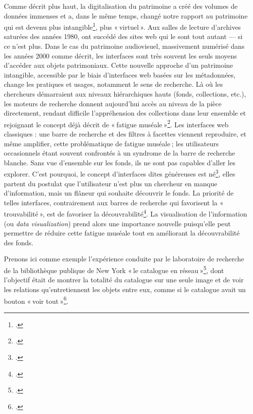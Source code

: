 Comme décrit plus haut, la digitalisation du patrimoine a créé des volumes de données immenses et a, dans le même temps, changé notre rapport au patrimoine qui est devenu plus intangible\footcite[p. 1]{windhager_visualization_2019}, plus « virtuel ». Aux salles de lecture d’archives saturées des années 1980, ont succédé des sites web qui le sont tout autant — si ce n’est plus. Dans le cas du patrimoine audiovisuel, massivement numérisé dans les années 2000 comme décrit, les interfaces sont très souvent les seuls moyens d’accéder aux objets patrimoniaux. Cette nouvelle approche d’un patrimoine intangible, accessible par le biais d’interfaces web basées sur les métadonnées, change les pratiques et usages, notamment le sens de recherche. Là où les chercheurs démarraient aux niveaux hiérarchiques hauts (fonds, collections, etc.), les moteurs de recherche donnent aujourd’hui accès au niveau de la pièce directement, rendant difficile l’appréhension des collections dans leur ensemble et rejoignant le concept déjà décrit de « fatigue muséale »\footcite[pp. 62-72]{gilman_museum_1916}. Les interfaces web classiques : une barre de recherche et des filtres à facettes viennent reproduire, et même amplifier, cette problématique de fatigue muséale ; les utilisateurs occasionnels étant souvent confrontés à un syndrome de la barre de recherche blanche. Sans vue d’ensemble sur les fonds, ils ne sont pas capables d’aller les explorer. C’est pourquoi, le concept d’interfaces dites généreuses est né\footcite[pp. 5-6]{windhager_orchestrating_2018}, elles partent du postulat que l’utilisateur n’est plus un chercheur en manque d’information, mais un flâneur qui souhaite découvrir le fonds. La priorité de telles interfaces, contrairement aux barres de recherche qui favorisent la « trouvabilité », est de favoriser la découvrabilité\footcite[p. 18]{shen_generous_2023}. La visualisation de l’information (ou \textit{data visualization}) prend alors une importance nouvelle puisqu’elle peut permettre de réduire cette fatigue muséale tout en améliorant la découvrabilité des fonds.

Prenons ici comme exemple l’expérience conduite par le laboratoire de recherche de la bibliothèque publique de New York « le catalogue en réseau »\footcite[§20 à §26]{lapotre_visualiser_2016}, dont l’objectif était de montrer la totalité du catalogue sur une seule image et de voir les relations qu’entretiennent les objets entre eux, comme si le catalogue avait un bouton « voir tout »\footcite{miller_networked_2014}.


